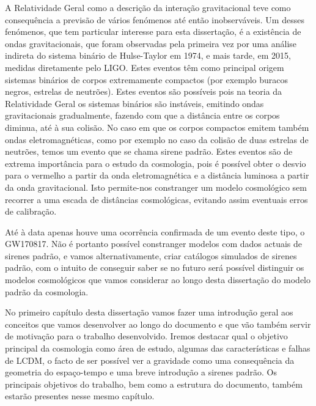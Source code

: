 A Relatividade Geral como a descrição da interação gravitacional teve como consequência a previsão de vários fenómenos até então inobserváveis. Um desses fenómenos, que tem particular interesse para esta dissertação, é a existência de ondas gravitacionais, que foram observadas pela primeira vez por uma análise indireta do sistema binário de Hulse-Taylor em 1974, e mais tarde, em 2015, medidas diretamente pelo \gls{LIGO}. Estes eventos têm como principal origem sistemas binários de corpos extremamente compactos (por exemplo buracos negros, estrelas de neutrões). Estes eventos são possíveis pois na teoria da Relatividade Geral os sistemas binários são instáveis, emitindo ondas gravitacionais gradualmente, fazendo com que a distância entre os corpos diminua, até
à sua colisão. No caso em que os corpos compactos emitem também ondas eletromagnéticas, como por exemplo no caso da colisão de duas estrelas de neutrões, temos um evento que se chama sirene padrão. Estes eventos são de extrema importância para o estudo da cosmologia, pois é possível obter o desvio para o vermelho a partir da onda eletromagnética e a distância luminosa a partir da onda gravitacional. Isto permite-nos constranger um modelo cosmológico sem recorrer a uma escada de distâncias cosmológicas, evitando assim eventuais erros de calibração.

Até à data apenas houve uma ocorrência confirmada de um evento deste tipo, o GW170817. Não é portanto possível constranger modelos com dados actuais de sirenes padrão, e vamos alternativamente, criar catálogos simulados de sirenes padrão, com o intuito de conseguir saber se no futuro será possível distinguir os modelos cosmológicos que vamos considerar ao longo desta dissertação do modelo padrão da cosmologia.

No primeiro capítulo desta dissertação vamos fazer uma introdução geral aos conceitos que vamos desenvolver ao longo do documento e que vão também servir de motivação para o trabalho desenvolvido. Iremos destacar qual o objetivo principal da cosmologia como área de estudo, algumas das características e falhas de \gls{LCDM}, o facto de ser possível ver a gravidade como uma consequência da geometria do espaço-tempo e uma breve introdução a sirenes padrão. Os principais objetivos do trabalho, bem como a estrutura do documento, também estarão presentes nesse mesmo capítulo.

